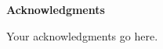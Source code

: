 
\begin{center}
{\large\bfseries Acknowledgments}
\end{center}

\vspace{1em}


Your acknowledgments go here.

\vfill
